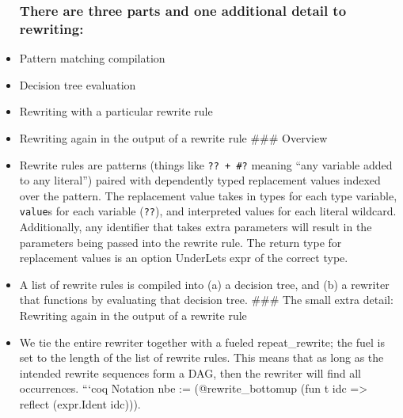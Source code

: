 \begin{itemize}
  \subsubsection{There are three parts and one additional detail to
  rewriting:}\label{there-are-three-parts-and-one-additional-detail-to-rewriting}
\item
  Pattern matching compilation
\item
  Decision tree evaluation
\item
  Rewriting with a particular rewrite rule
\item
  Rewriting again in the output of a rewrite rule \#\#\# Overview
\item
  Rewrite rules are patterns (things like \texttt{??\ +\ \#?} meaning
  ``any variable added to any literal'') paired with dependently typed
  replacement values indexed over the pattern. The replacement value
  takes in types for each type variable, \texttt{value}s for each
  variable (\texttt{??}), and interpreted values for each literal
  wildcard. Additionally, any identifier that takes extra parameters
  will result in the parameters being passed into the rewrite rule. The
  return type for replacement values is an option UnderLets expr of the
  correct type.
\item
  A list of rewrite rules is compiled into (a) a decision tree, and (b)
  a rewriter that functions by evaluating that decision tree. \#\#\# The
  small extra detail: Rewriting again in the output of a rewrite rule
\item
  We tie the entire rewriter together with a fueled repeat\_rewrite; the
  fuel is set to the length of the list of rewrite rules. This means
  that as long as the intended rewrite sequences form a DAG, then the
  rewriter will find all occurrences. ```coq Notation nbe :=
  (@rewrite\_bottomup (fun t idc =\textgreater{} reflect (expr.Ident
  idc))).
\end{itemize}

